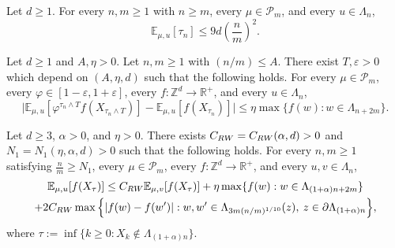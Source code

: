 \documentclass[10pt,a4paper]{amsart}
\begin{document}
\begin{Prop}\label{prop: exponential moment exit time} Let $d\geq 1$. For every $n,m\geq 1$ with $n\geq m$, every $\mu \in \mathcal P_m$, and every $u\in \Lambda_n$,
\begin{equation}
	\mathbb E_{\mu,u}[\tau_n]\leq 9d\left(\frac{n}{m}\right)^2.
\end{equation}

\end{Prop}

\begin{Cor}\label{cor: estimate srw} Let $d\geq 1$ and $A,\eta>0$. Let $n,m\geq 1$ with $(n/m)\leq A$. There exist $T,\varepsilon>0$ which depend on $(A, \eta,d)$ such that the following holds. For every $\mu \in \mathcal P_m$, every $\varphi\in [1-\varepsilon,1+\varepsilon]$, every $f:\mathbb Z^d\rightarrow \mathbb R^+$, and every $u \in \Lambda_n$,
\begin{equation}
	\Big|\mathbb E_{\mu,u}[\varphi^{\tau_n\wedge T}f(X_{\tau_n\wedge T})]-\mathbb E_{\mu,u}[f(X_{\tau_n})]\Big|\leq \eta \max\{f(w):w\in \Lambda_{n+2m}\}.
\end{equation}
\end{Cor}

\begin{Prop}\label{prop:uniform Harnack} Let $d\geq 3$, $\alpha>0$, and $\eta>0$. There exists $C_{\rm RW}=C_{\rm RW}(\alpha,d)>0$ and $N_1=N_1(\eta,\alpha,d)>0$ such that the following holds. For every $n,m\geq 1$ satisfying $\tfrac{n}{m}\geq N_1$, every $\mu\in \mathcal P_m$, every $f:\mathbb Z^d\rightarrow \mathbb R^+$, and every $u,v\in \Lambda_n$,
\begin{multline}
	\mathbb E_{\mu,u}[f(X_\tau)]\leq C_{\rm RW}\mathbb E_{\mu,v}[f(X_\tau)] +\eta\max\{f(w):w\in \Lambda_{(1+\alpha)n+2m}\}\\+2C_{\rm RW}\max\Big\{|f(w)-f(w')|: w,w'\in \Lambda_{3m(n/m)^{1/10}}(z), \: z\in \partial \Lambda_{(1+\alpha)n}\Big\},
\end{multline}
where $\tau:=\inf \{k\geq 0: X_k\notin \Lambda_{(1+\alpha)n}\}$.
\end{Prop}
\end{document}
